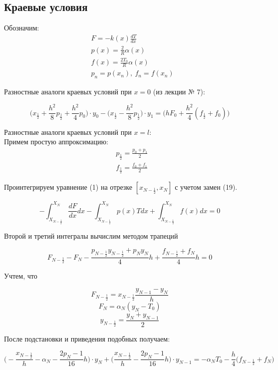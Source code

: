 \documentclass[a4paper, 14pt]{article}
\begin{document}
\subsection*{Краевые условия}
Обозначим:
\begin{equation}
\begin{aligned}
&F=-k(x)\frac{dT}{dx}\\
&p(x)=\frac{2}{R}\alpha(x)\\
&f(x)=\frac{2T_0}{R}\alpha(x)\\
&p_n=p(x_n), ~f_n=f(x_n)
\end{aligned}
\end{equation}

Разностные аналоги краевых условий при $x=0$ (из лекции № 7):

\begin{equation}
\bigg(x_{\frac{1}{2}} + \frac{h^2}{8}p_{\frac{1}{2}}+\frac{h^2}{4}p_0\bigg) \cdot y_0 - \bigg(x_{\frac{1}{2}}-\frac{h^2}{8}p_{\frac{1}{2}}\bigg) \cdot y_1=\bigg(hF_0+\frac{h^2}{4}(f_{\frac{1}{2}}+f_0)\bigg)
\end{equation}

Разностные аналоги краевых условий при $x=l$:\\

Примем простую аппроксимацию:
\begin{equation}
\begin{aligned}
&p_{\frac{1}{2}}=\frac{p_0+p_1}{2}\\
&f_{\frac{1}{2}}=\frac{f_0+f_1}{2}\
\end{aligned}
\end{equation}

Проинтегрируем уравнение (1) на отрезке $[x_{N-\frac{1}{2}}, x_N]$ с учетом замен (19).

$$-\int^{X_N}_{X_{N-{\frac{1}{2}}}}\frac{dF}{dx}dx-\int^{X_N}_{X_{N-{\frac{1}{2}}}}p(x)Tdx+\int^{X_N}_{X_{N-{\frac{1}{2}}}}f(x)dx=0$$

Второй и третий интегралы вычислим методом трапеций

$$F_{N-\frac{1}{2}}-F_N-\frac{p_{N-\frac{1}{2}}y_{N-\frac{1}{2}}+p_Ny_N}{4}h+\frac{f_{N-\frac{1}{2}}+f_N}{4}h=0$$

Учтем, что

$$F_{N-\frac{1}{2}}=x_{N-\frac{1}{2}}\frac{y_{N-1}-y_N}{h}$$
$$F_N=\alpha_N(y_N-T_0)$$
$$y_{N-\frac{1}{2}}=\frac{y_N+y_{N-1}}{2}$$

После подстановки и приведения подобных получаем:

\begin{equation}
\bigg(-\frac{x_{N-\frac{1}{2}}}{h} - \alpha_N - \frac{2p_N - 1}{16}h\bigg) \cdot y_N + \bigg (\frac{x_{N-\frac{1}{2}}}{h} - \frac{2p_N - 1}{16}h\bigg) \cdot y_{N-1} = - \alpha_NT_0 - \frac{h}{4} \bigg({f_{N-\frac{1}{2}}+f_N}\bigg)
\end{equation} 
\end{document}
